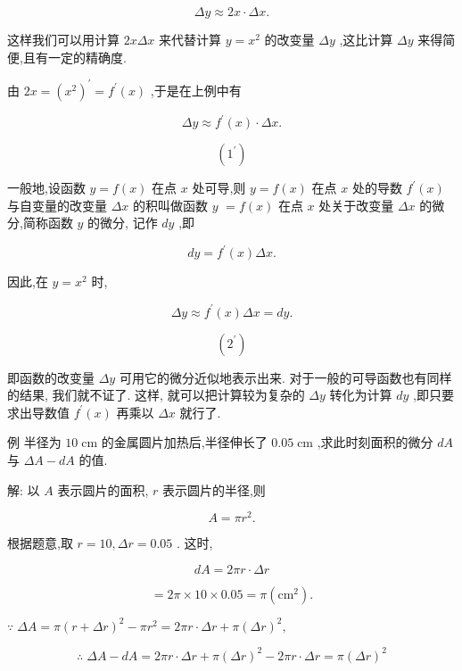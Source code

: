\documentclass[10pt]{article}
\begin{document}
\[
{\Delta y} \approx {2x} \cdot {\Delta x}.
\]

这样我们可以用计算 \({2x\Delta x}\) 来代替计算 \(y = {x}^{2}\) 的改变量 \({\Delta y}\) ,这比计算 \({\Delta y}\) 来得简便,且有一定的精确度.

由 \({2x} = {\left( {x}^{2}\right) }^{\prime } = {f}^{\prime }\left( x\right)\) ,于是在上例中有

\[
{\Delta y} \approx {f}^{\prime }\left( x\right) \cdot {\Delta x}.
\]

\[
\left( {1}^{\prime }\right)
\]

一般地,设函数 \(y = f\left( x\right)\) 在点 \(x\) 处可导,则 \(y = f\left( x\right)\) 在点 \(x\) 处的导数 \({f}^{\prime }\left( x\right)\) 与自变量的改变量 \({\Delta x}\) 的积叫做函数 \(y\) \(= f\left( x\right)\) 在点 \(x\) 处关于改变量 \({\Delta x}\) 的微分,简称函数 \(y\) 的微分, 记作 \({dy}\) ,即

\[
{dy} = {f}^{\prime }\left( x\right) {\Delta x}. \tag{2}
\]

因此,在 \(y = {x}^{2}\) 时,

\[
{\Delta y} \approx {f}^{\prime }\left( x\right) {\Delta x} = {dy}.
\]

\[
\left( {2}^{\prime }\right)
\]

即函数的改变量 \({\Delta y}\) 可用它的微分近似地表示出来. 对于一般的可导函数也有同样的结果, 我们就不证了. 这样, 就可以把计算较为复杂的 \({\Delta y}\) 转化为计算 \({dy}\) ,即只要求出导数值 \({f}^{\prime }\left( x\right)\) 再乘以 \({\Delta x}\) 就行了.

例 半径为 \({10}\mathrm{\;{cm}}\) 的金属圆片加热后,半径伸长了 \({0.05}\mathrm{\;{cm}}\) ,求此时刻面积的微分 \({dA}\) 与 \({\Delta A} - {dA}\) 的值.

解: 以 \(A\) 表示圆片的面积, \(r\) 表示圆片的半径,则

\[
A = \pi {r}^{2}.
\]

根据题意,取 \(r = {10},{\Delta r} = {0.05}\) . 这时,

\[
{dA} = {2\pi r} \cdot {\Delta r}
\]

\[
= {2\pi } \times {10} \times {0.05} = \pi \left( {\mathrm{{cm}}}^{2}\right) \text{.}
\]

\(\because \;{\Delta A} = \pi {\left( r + \Delta r\right) }^{2} - \pi {r}^{2} = {2\pi r} \cdot {\Delta r} + \pi {\left( \Delta r\right) }^{2},\)

\[
\therefore \;{\Delta A} - {dA} = {2\pi r} \cdot {\Delta r} + \pi {\left( \Delta r\right) }^{2} - {2\pi r} \cdot {\Delta r} = \pi {\left( \Delta r\right) }^{2}
\]
\end{document}
